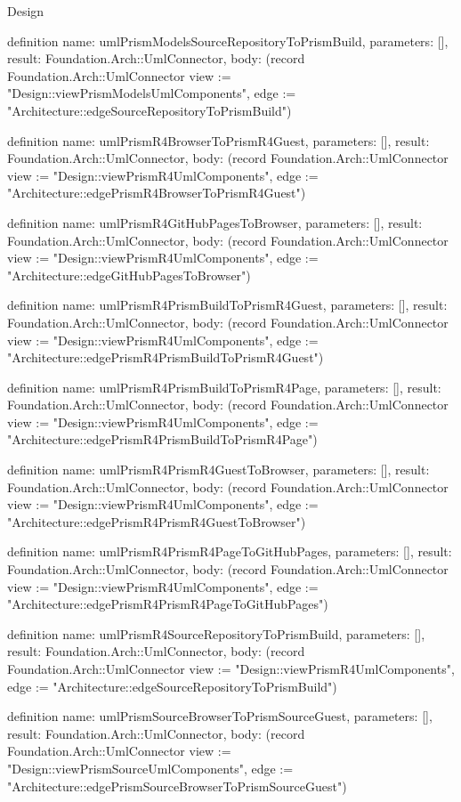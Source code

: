\begin{lexlean}{Design}
\begin{semanticmodule}
definition{
  name: umlPrismModelsSourceRepositoryToPrismBuild,
  parameters: [],
  result: Foundation.Arch::UmlConnector,
  body: (record Foundation.Arch::UmlConnector {view := "Design::viewPrismModelsUmlComponents", edge := "Architecture::edgeSourceRepositoryToPrismBuild"})
}

definition{
  name: umlPrismR4BrowserToPrismR4Guest,
  parameters: [],
  result: Foundation.Arch::UmlConnector,
  body: (record Foundation.Arch::UmlConnector {view := "Design::viewPrismR4UmlComponents", edge := "Architecture::edgePrismR4BrowserToPrismR4Guest"})
}

definition{
  name: umlPrismR4GitHubPagesToBrowser,
  parameters: [],
  result: Foundation.Arch::UmlConnector,
  body: (record Foundation.Arch::UmlConnector {view := "Design::viewPrismR4UmlComponents", edge := "Architecture::edgeGitHubPagesToBrowser"})
}

definition{
  name: umlPrismR4PrismBuildToPrismR4Guest,
  parameters: [],
  result: Foundation.Arch::UmlConnector,
  body: (record Foundation.Arch::UmlConnector {view := "Design::viewPrismR4UmlComponents", edge := "Architecture::edgePrismR4PrismBuildToPrismR4Guest"})
}

definition{
  name: umlPrismR4PrismBuildToPrismR4Page,
  parameters: [],
  result: Foundation.Arch::UmlConnector,
  body: (record Foundation.Arch::UmlConnector {view := "Design::viewPrismR4UmlComponents", edge := "Architecture::edgePrismR4PrismBuildToPrismR4Page"})
}

definition{
  name: umlPrismR4PrismR4GuestToBrowser,
  parameters: [],
  result: Foundation.Arch::UmlConnector,
  body: (record Foundation.Arch::UmlConnector {view := "Design::viewPrismR4UmlComponents", edge := "Architecture::edgePrismR4PrismR4GuestToBrowser"})
}

definition{
  name: umlPrismR4PrismR4PageToGitHubPages,
  parameters: [],
  result: Foundation.Arch::UmlConnector,
  body: (record Foundation.Arch::UmlConnector {view := "Design::viewPrismR4UmlComponents", edge := "Architecture::edgePrismR4PrismR4PageToGitHubPages"})
}

definition{
  name: umlPrismR4SourceRepositoryToPrismBuild,
  parameters: [],
  result: Foundation.Arch::UmlConnector,
  body: (record Foundation.Arch::UmlConnector {view := "Design::viewPrismR4UmlComponents", edge := "Architecture::edgeSourceRepositoryToPrismBuild"})
}

definition{
  name: umlPrismSourceBrowserToPrismSourceGuest,
  parameters: [],
  result: Foundation.Arch::UmlConnector,
  body: (record Foundation.Arch::UmlConnector {view := "Design::viewPrismSourceUmlComponents", edge := "Architecture::edgePrismSourceBrowserToPrismSourceGuest"})
}


\end{semanticmodule}
\end{lexlean}
